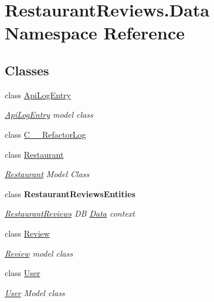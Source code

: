 \hypertarget{namespace_restaurant_reviews_1_1_data}{}\section{Restaurant\+Reviews.\+Data Namespace Reference}
\label{namespace_restaurant_reviews_1_1_data}
\subsection*{Classes}
\begin{DoxyCompactItemize}
\item 
class \hyperlink{class_restaurant_reviews_1_1_data_1_1_api_log_entry}{Api\+Log\+Entry}
\begin{DoxyCompactList}\small\item\em \hyperlink{class_restaurant_reviews_1_1_data_1_1_api_log_entry}{Api\+Log\+Entry} model class \end{DoxyCompactList}\item 
class \hyperlink{class_restaurant_reviews_1_1_data_1_1_c_____refactor_log}{C\+\_\+\+\_\+\+Refactor\+Log}
\item 
class \hyperlink{class_restaurant_reviews_1_1_data_1_1_restaurant}{Restaurant}
\begin{DoxyCompactList}\small\item\em \hyperlink{class_restaurant_reviews_1_1_data_1_1_restaurant}{Restaurant} Model Class \end{DoxyCompactList}\item 
class {\bfseries Restaurant\+Reviews\+Entities}
\begin{DoxyCompactList}\small\item\em \hyperlink{namespace_restaurant_reviews}{Restaurant\+Reviews} DB \hyperlink{namespace_restaurant_reviews_1_1_data}{Data} context \end{DoxyCompactList}\item 
class \hyperlink{class_restaurant_reviews_1_1_data_1_1_review}{Review}
\begin{DoxyCompactList}\small\item\em \hyperlink{class_restaurant_reviews_1_1_data_1_1_review}{Review} model class \end{DoxyCompactList}\item 
class \hyperlink{class_restaurant_reviews_1_1_data_1_1_user}{User}
\begin{DoxyCompactList}\small\item\em \hyperlink{class_restaurant_reviews_1_1_data_1_1_user}{User} Model class \end{DoxyCompactList}\end{DoxyCompactItemize}
